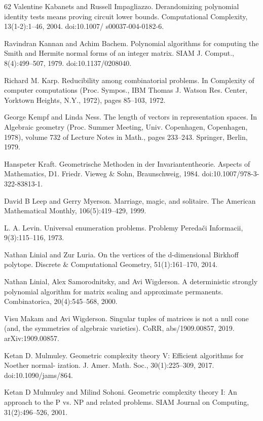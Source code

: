 \documentclass[10pt,a4paper]{article}
\theoremstyle{definition}
\numberwithin{equation}{section}
\begin{document}
\begin{thebibliography}{62}
Valentine Kabanets and Russell Impagliazzo. Derandomizing polynomial identity tests means proving circuit lower bounds. Computational Complexity, 13(1-2):1–46, 2004. doi:10.1007/ s00037-004-0182-6.

Ravindran Kannan and Achim Bachem. Polynomial algorithms for computing the Smith and Hermite normal forms of an integer matrix. SIAM J. Comput., 8(4):499–507, 1979. doi:10.1137/0208040.

Richard M. Karp. Reducibility among combinatorial problems. In Complexity of computer computations (Proc. Sympos., IBM Thomas J. Watson Res. Center, Yorktown Heights, N.Y., 1972), pages 85–103, 1972.

George Kempf and Linda Ness. The length of vectors in representation spaces. In Algebraic geometry (Proc. Summer Meeting, Univ. Copenhagen, Copenhagen, 1978), volume 732 of Lecture Notes in Math., pages 233–243. Springer, Berlin, 1979.

Hanspeter Kraft. Geometrische Methoden in der Invariantentheorie. Aspects of Mathematics, D1. Friedr. Vieweg \& Sohn, Braunschweig, 1984. doi:10.1007/978-3-322-83813-1.

David B Leep and Gerry Myerson. Marriage, magic, and solitaire. The American Mathematical Monthly, 106(5):419–429, 1999.

L. A. Levin. Universal enumeration problems. Problemy Peredači Informacii, 9(3):115–116, 1973.

Nathan Linial and Zur Luria. On the vertices of the d-dimensional Birkhoff polytope. Discrete \& Computational Geometry, 51(1):161–170, 2014.

Nathan Linial, Alex Samorodnitsky, and Avi Wigderson. A deterministic strongly polynomial algorithm for matrix scaling and approximate permanents. Combinatorica, 20(4):545–568, 2000.

Visu Makam and Avi Wigderson. Singular tuples of matrices is not a null cone (and, the symmetries of algebraic varieties). CoRR, abs/1909.00857, 2019. arXiv:1909.00857.

Ketan D. Mulmuley. Geometric complexity theory V: Efficient algorithms for Noether normal- ization. J. Amer. Math. Soc., 30(1):225–309, 2017. doi:10.1090/jams/864.

Ketan D Mulmuley and Milind Sohoni. Geometric complexity theory I: An approach to the P vs. NP and related problems. SIAM Journal on Computing, 31(2):496–526, 2001.


\end{thebibliography}
\end{document}
